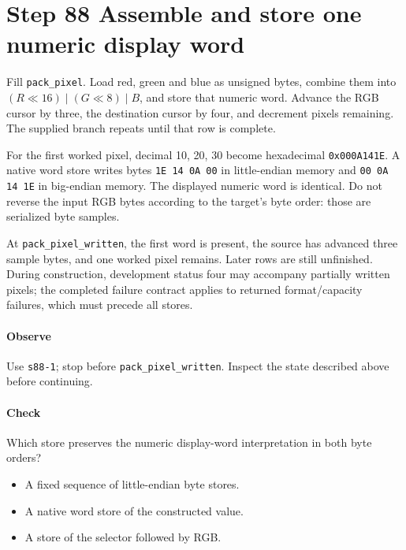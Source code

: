 \section{Step 88 Assemble and store one numeric display word}
Fill \texttt{pack\_pixel}. Load red, green and blue as unsigned bytes, combine them into $(R\ll16)\mathbin{|}(G\ll8)\mathbin{|}B$, and store that numeric word. Advance the RGB cursor by three, the destination cursor by four, and decrement pixels remaining. The supplied branch repeats until that row is complete.

For the first worked pixel, decimal 10, 20, 30 become hexadecimal \texttt{0x000A141E}. A native word store writes bytes \texttt{1E 14 0A 00} in little-endian memory and \texttt{00 0A 14 1E} in big-endian memory. The displayed numeric word is identical. Do not reverse the input RGB bytes according to the target’s byte order: those are serialized byte samples.

At \texttt{pack\_pixel\_written}, the first word is present, the source has advanced three sample bytes, and one worked pixel remains. Later rows are still unfinished. During construction, development status four may accompany partially written pixels; the completed failure contract applies to returned format/capacity failures, which must precede all stores.

\paragraph{Observe} Use \texttt{s88-1}; stop before \texttt{pack\_pixel\_written}. Inspect the state described above before continuing.

\paragraph{Check} Which store preserves the numeric display-word interpretation in both byte orders?
\begin{itemize}
  \item[A.] A fixed sequence of little-endian byte stores.
  \item[B.] A native word store of the constructed value.
  \item[C.] A store of the selector followed by RGB.
\end{itemize}
